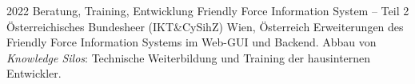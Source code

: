 \cventry
{2022}
{Beratung, Training, Entwicklung}
{Friendly Force Information System -- Teil 2}
{Österreichisches Bundesheer (IKT\&CySihZ)}
{Wien, Österreich}
{
  Erweiterungen des Friendly Force Information Systems im Web-GUI und Backend.
  Abbau von \emph{Knowledge Silos}: Technische Weiterbildung und Training der
  hausinternen Entwickler.
}
